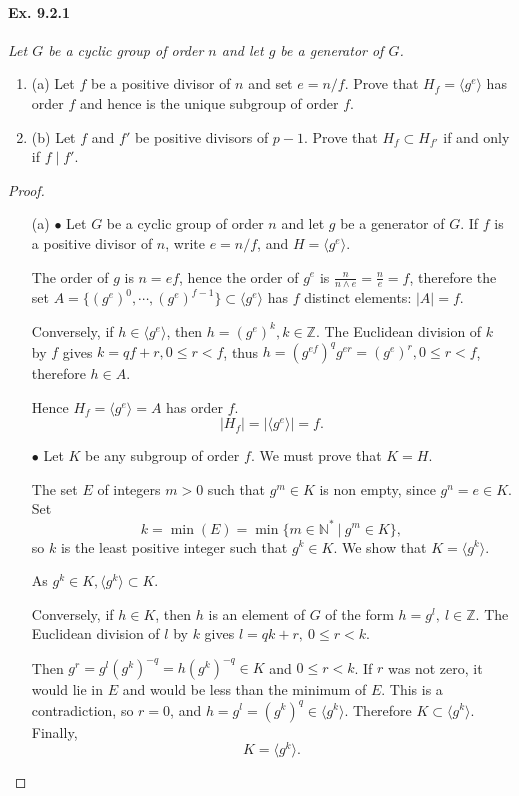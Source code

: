\documentclass[11pt,a4paper]{article}
\newcommand{\be} {\begin{enumerate}}
\newcommand{\ee} {\end{enumerate}}
\newcommand{\Z}{\mathbb{Z}}
\newcommand{\N}{\mathbb{N}}
\begin{document}
\paragraph{Ex. 9.2.1}

{\it Let $G$ be a cyclic group of order $n$ and let $g$ be a generator of $G$.
\be
\item[(a)] Let $f$ be a positive divisor of $n$ and set $e = n/f$. Prove that $H_f = \langle g^e \rangle$ has order $f$ and hence is the unique subgroup of order $f$.

\item[(b)] Let $f$ and $f'$ be positive divisors of $p-1$. Prove that $H_f \subset H_{f'}$ if and only if $f \mid f'$.
\ee
}

\begin{proof}
\begin{enumerate}
\item[(a)]
$\bullet$ Let $G$ be a cyclic group of order $n$ and let $g$ be a generator of $G$. If $f$ is a positive divisor of $n$, write $e = n/f$, and $H = \langle g^e\rangle$.

The order of $g$ is $n = ef$, hence the order of $g^e$ is $\frac{n}{n\wedge e} = \frac{n}{e} = f$, therefore the set  $A = \{(g^e)^0,\cdots, (g^e)^{f-1}\} \subset \langle g^e \rangle$ has $f$  distinct elements: $\vert A \vert = f$. 

Conversely, if $h \in \langle g^e\rangle$, then $h = (g^e)^k, k \in \Z$.
The Euclidean division of $k$ by $f$ gives $k = qf+r, 0 \leq r <f$, thus $h = (g^{ef})^q g^{er} = ({g^e})^r, 0 \leq r <f$, therefore $h \in A$. 
 
Hence $H_f = \langle g^e \rangle = A$ has order  $f$.
$$\vert H_f\vert = \vert \langle g^e \rangle \vert = f.$$

\bigskip

$\bullet$ Let $K$ be any subgroup of order $f$. We must prove that $K = H$.

The set $E$ of integers $m>0$ such that $g^m \in K$ is non empty, since $g^n=e \in K$. Set
$$k = \min(E) =  \min\{m \in \N^*\  \vert \ g^m \in K\},$$
so $k$ is the least positive integer such that $g^k \in K$. We show that $K = \langle g^k \rangle$.

As $g^k \in K, \langle g^k \rangle \subset K$.

Conversely, if $h \in K$, then $h$ is an element of $G$ of the form $h=g^l, \ l\in \Z$. The Euclidean division of $l$ by $k$ gives $l = qk+r, \ 0 \leq r<k$.

Then $g^r = g^l(g^k)^{-q} = h (g^k)^{-q} \in K$ and $0\leq r < k$. If $r$ was not zero, it would lie in $E$ and would be less than the minimum of $E$. This is a contradiction, so $r=0$, and $h = g^l =(g^k)^{q} \in \langle g^k \rangle$. Therefore $K \subset \langle g^k  \rangle$. Finally,
$$K = \langle g^k \rangle.$$


\end{enumerate}
\end{proof}
\end{document}
